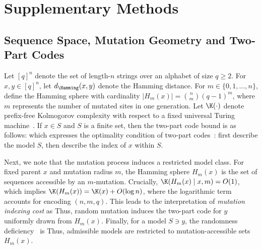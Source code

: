 
\setcounter{equation}{0}
\renewcommand{\theequation}{S\arabic{equation}}

\setcounter{figure}{0}
\renewcommand{\thefigure}{S\arabic{figure}}

\setcounter{table}{0}
\renewcommand{\thetable}{S\arabic{table}}

\setcounter{theorem}{0}
\renewcommand{\thetheorem}{S\arabic{theorem}}
\setcounter{definition}{0}
\renewcommand{\thedefinition}{S\arabic{definition}}

\setcounter{lemma}{0}
\renewcommand{\thelemma}{S\arabic{lemma}}
\setcounter{corollary}{0}
\renewcommand{\thecorollary}{S\arabic{corollary}}


\section*{Supplementary Methods}


\subsection*{Sequence Space, Mutation Geometry and Two-Part Codes}\label{sec:si:setup}

Let $[q]^n$ denote the set of length-$n$ strings over an alphabet of size $q \ge 2$. For $x,y\in[q]^n$, let $d_{\Hamming}(x,y)$ denote the Hamming distance.
For $m\in\{0,1,\dots,n\}$, define the Hamming sphere
with cardinality $|H_m(x)|=\binom{n}{m}(q-1)^m$, where $m$ represents the number of mutated sites in one generation.
Let $\K(\cdot)$ denote prefix-free Kolmogorov complexity with respect to a fixed universal Turing machine~\cite{LiVitanyi2019}.
If $x\in S$ and $S$ is a finite set, then the two-part code bound is as follows:
which expresses the optimality condition of two-part codes~\cite{LiVitanyi2019,GacsTrompVitanyi2001}: first describe the model $S$, then describe the index of $x$ within $S$.

Next, we note that the mutation process induces a restricted model class. For fixed parent $x$ and mutation radius $m$, the Hamming sphere $H_m(x)$ is the set of sequences accessible by an $m$-mutation. Crucially, $\K(H_m(x)\mid x,m)=O(1)$, which implies
$\K(H_m(x))=\K(x)+O(\log n)$,
where the logarithmic term accounts for encoding $(n,m,q)$.
This leads to the interpretation of \emph{mutation indexing cost} as
Thus, random mutation induces the two-part code
for $y$ uniformly drawn from $H_m(x)$.
Finally, for a model $S\ni y$, the randomness deficiency~\cite{LiVitanyi2019,GacsTrompVitanyi2001} is
Thus, admissible models are restricted to mutation-accessible sets $H_m(x)$.

